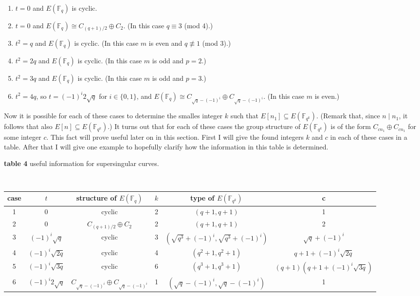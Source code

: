 \documentclass{article}
\numberwithin{equation}{section}
\theoremstyle{definition}
\newcommand{\FF}[1]{{\mathbb F}_{#1}} %
\begin{document}
\begin{enumerate}
\item $t=0$ and $E(\FF{q})$ is cyclic.
\item $t=0$ and $E(\FF{q}) \cong C_{(q+1)/2}\oplus C_2$. (In this case $q \equiv 3$ (mod 4).)
\item $t^2=q$ and $E(\FF{q})$ is cyclic. (In this case $m$ is even and $q \not \equiv 1$ (mod 3).)
\item $t^2=2q$ and $E(\FF{q})$ is cyclic. (In this case $m$ is odd and $p=2$.)
\item $t^2=3q$ and $E(\FF{q})$ is cyclic. (In this case $m$ is odd and $p=3$.)
\item $t^2=4q$, so $t=(-1)^i2\sqrt{q}$ for $i\in \{0,1\}$, and $E(\FF{q})\cong C_{\sqrt{q}-(-1)^i}\oplus C_{\sqrt{q}-(-1)^i}$. (In this case $m$ is even.)
\end{enumerate}

Now it is possible for each of these cases to determine the smalles integer $k$ such that $E[n_1] \subseteq E(\FF{q^k})$. (Remark that, since $n \mid n_1$, it follows that also $E[n] \subseteq E(\FF{q^k})$.) It turns out that for each of these cases the group structure of $E(\FF{q^k})$ is of the form $C_{cn_1}\oplus C_{cn_1}$ for some integer $c$. This fact will prove useful later on in this section. First I will give the found integers $k$ and $c$ in each of these cases in a table. After that I will give one example to hopefully clarify how the information in this table is determined. 

\begin{center}
  \caption{{\bf table 4} useful information for supersingular curves.}\\
{\footnotesize \begin{tabular}{ | c | c | c | c | c | c | }
    \hline
    case & $t$ & structure of $E(\FF{q})$ & $k$ & type of $E(\FF{q^k})$ & c\\
    \hline \hline
    1 & 0 & cyclic &  2 & $(q+1,q+1)$ & 1 \\
    2 & 0 & $C_{(q+1)/2} \oplus C_2$ & 2 & $(q+1,q+1)$ & 2\\
    3 & $(-1)^i \sqrt{q}$ & cyclic & 3 & $(\sqrt{q^3} + (-1)^i, \sqrt{q^3} + (-1)^i)$ & $\sqrt{q} + (-1)^i$\\
    4 & $(-1)^i \sqrt{2q}$ & cyclic & 4 & $(q^2+1,q^2+1)$ & $q+1+(-1)^i \sqrt{2q}$\\
    5 & $(-1)^i \sqrt{3q}$ & cyclic & 6 & $(q^3+1,q^3+1)$ & $(q+1)(q+1 + (-1)^i \sqrt{3q})$\\
    6 & $(-1)^i 2 \sqrt{q}$ & $C_{\sqrt{q}-(-1)^i} \oplus C_{\sqrt{q}-(-1)^i}$ & 1 & $(\sqrt{q} - (-1)^i,\sqrt{q} - (-1)^i)$ & 1\\
    \hline
  \end{tabular}}
\end{center}
\end{document}
